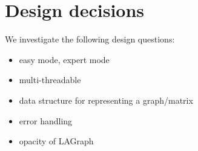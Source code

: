 \section{Design decisions}
\label{sec:decisions}


We investigate the following design questions:

\begin{itemize}
    \item easy mode, expert mode
    \item multi-threadable
    \item data structure for representing a graph/matrix
    \item error handling
    \item opacity of LAGraph
\end{itemize}
